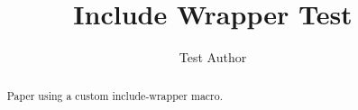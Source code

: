\documentclass{article}
\title{Include Wrapper Test}
\author{Test Author}
\begin{document}
\maketitle
\begin{abstract}
Paper using a custom include-wrapper macro.
\end{abstract}
\end{document}
